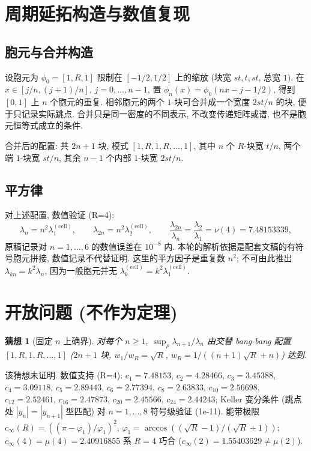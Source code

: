 \documentclass[UTF8]{ctexart}
\newtheorem{conjecture}[theorem]{猜想}
\begin{document}
\section{周期延拓构造与数值复现}

\subsection{胞元与合并构造}

设胞元为 $\phi_0 = [1, R, 1]$ 限制在 $[-1/2, 1/2]$ 上的缩放 (块宽 $st, t, st$,
总宽 $1$). 在 $x\in[j/n,(j+1)/n]$, $j=0,\ldots,n-1$, 置
$\phi_n(x)=\phi_0(nx-j-1/2)$, 得到 $[0,1]$ 上 $n$ 个胞元的重复.
相邻胞元的两个 $1$-块可合并成一个宽度 $2st/n$ 的块, 便于只记录实际跳点.
合并只是同一密度的不同表示, 不改变传递矩阵或谱, 也不是胞元恒等式成立的条件.

合并后的配置: 共 $2n+1$ 块, 模式 $[1, R, 1, R, \dots, 1]$,
其中 $n$ 个 $R$-块宽 $t/n$, 两个端 $1$-块宽 $st/n$, 其余 $n-1$ 个内部 $1$-块宽 $2st/n$.

\subsection{平方律}

对上述配置, 数值验证 (R=4):
\begin{equation}
	\lambda_n = n^2 \lambda_1^{(\text{cell})}, \qquad
	\lambda_{2n} = n^2 \lambda_2^{(\text{cell})}, \qquad
	\frac{\lambda_{2n}}{\lambda_n} = \frac{\lambda_2}{\lambda_1} = \nu(4) = 7.48153339,
\end{equation}
原稿记录对 $n=1,\ldots,6$ 的数值误差在 $10^{-8}$ 内.
本轮的解析依据是配套文稿的有符号胞元拼接, 数值记录不代替证明.
这里的平方因子是重复数 $n^2$; 不可由此推出 $\lambda_{kn}=k^2\lambda_n$,
因为一般胞元并无 $\lambda_k^{(\mathrm{cell})}=k^2\lambda_1^{(\mathrm{cell})}$.

\section{开放问题 (不作为定理)}\label{sec:open}

\begin{conjecture}[固定 $n$ 上确界]
对每个 $n \geq 1$, $\sup_{\rho} \lambda_{n+1}/\lambda_n$ 由交替 bang-bang 配置
$[1, R, 1, R, \dots, 1]$ ($2n+1$ 块, $w_1/w_R = \sqrt{R}$, $w_R = 1/((n+1)\sqrt{R}+n)$) 达到.
\end{conjecture}

该猜想未证明. 数值支持 (R=4): $c_1 = 7.48153$, $c_2 = 4.28466$, $c_3 = 3.45388$,
$c_4 = 3.09118$, $c_5 = 2.89443$, $c_6 = 2.77394$, $c_8 = 2.63833$, $c_{10} = 2.56698$,
$c_{12} = 2.52461$, $c_{16} = 2.47873$, $c_{20} = 2.45566$, $c_{24} = 2.44243$;
Keller 变分条件 (跳点处 $|y_n| = |y_{n+1}|$ 型匹配) 对 $n = 1,\dots,8$ 符号级验证 (1e-11).
能带极限 $c_{\infty}(R) = ((\pi-\varphi_1)/\varphi_1)^2$,
$\varphi_1 = \arccos((\sqrt{R}-1)/(\sqrt{R}+1))$; $c_{\infty}(4) = \mu(4) = 2.40916855$
系 $R = 4$ 巧合 ($c_{\infty}(2) = 1.55403629 \neq \mu(2)$).
\end{document}
